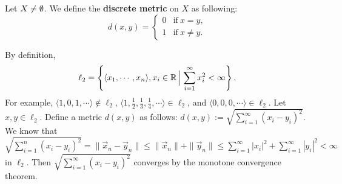 \begin{example}
    Let $X \neq \emptyset$. We define the \textbf{discrete metric} on $X$ as following:
    \[
        d(x,y)=
        \begin{cases}
            0 & \text{if} \ x= y,\\
            1 & \text{if} \ x \neq y.
        \end{cases}
    \] 
\end{example}
\begin{example}
   By definition, \[
   \ell_2= \left\{ \langle x_1,\cdots ,x_n  \rangle , x_i  \in \mathbb{R} \, \Big| \, \sum_{i=1}^{\infty} x_i  ^2 < \infty \right\} .
   \]  For example, $\langle 1,0,1,\cdots  \rangle \notin \ell_2$, $\langle 1, \frac{1}{2}, \frac{1}{3}, \frac{1}{4}, \cdots  \rangle \in \ell_2$, and $\langle 0,0,0,\cdots  \rangle \in \ell_2$. Let $x,y \in \ell_2$. Define a metric $d(x,y)$ as follows: $d(x,y) := \sqrt{\sum_{i=1}^{\infty} (x_i -y_i )^2} $. We know that $\sqrt{\sum_{i=1}^{n} (x_i -y_i )^2} =\|\vec x_n  - \vec y _n \|\leq \| \vec x _n \|+ \|\vec y _n \| \leq \sum_{i=1}^{\infty} |x_i |^2 + \sum_{i=1}^{\infty} |y_i |^2 < \infty$ in $\ell_2$. Then $\sqrt{\sum_{i=1}^{\infty} (x_i -y_i )^2} $ converges by the monotone convergence theorem.
\end{example}
